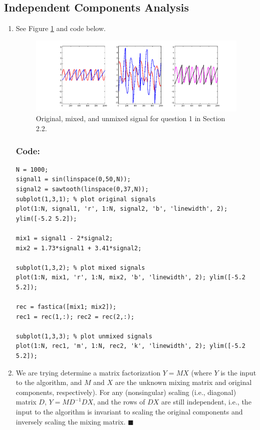 \documentclass[11pt]{article}
\renewcommand{\qed}{\quad \ensuremath{\blacksquare}}
\newcommand{\inv}{^{-1}}
\begin{document}
\newpage
\subsection{Independent Components Analysis}
\begin{enumerate}
\item See Figure \ref{fig:q23} and code below.
\begin{figure}[h!]
\centering
\quad\;
\includegraphics[trim=10mm 0mm 10mm 0mm, clip=true, width=\linewidth]{q23}
\vspace{-6mm}
\caption{Original, mixed, and unmixed signal for question 1 in Section 2.2.}
\label{fig:q23}
\end{figure}
\subsubsection*{Code:}
\begin{verbatim}
N = 1000;
signal1 = sin(linspace(0,50,N));
signal2 = sawtooth(linspace(0,37,N));
subplot(1,3,1); % plot original signals
plot(1:N, signal1, 'r', 1:N, signal2, 'b', 'linewidth', 2); ylim([-5.2 5.2]);

mix1 = signal1 - 2*signal2;
mix2 = 1.73*signal1 + 3.41*signal2;

subplot(1,3,2); % plot mixed signals
plot(1:N, mix1, 'r', 1:N, mix2, 'b', 'linewidth', 2); ylim([-5.2 5.2]);

rec = fastica([mix1; mix2]);
rec1 = rec(1,:); rec2 = rec(2,:);

subplot(1,3,3); % plot unmixed signals
plot(1:N, rec1, 'm', 1:N, rec2, 'k', 'linewidth', 2); ylim([-5.2 5.2]);
\end{verbatim}
\item We are trying determine a matrix factorization $Y = MX$ (where
$Y$ is the input to the algorithm, and $M$ and $X$ are the unknown mixing
matrix and original components, respectively). For any (nonsingular) scaling
(i.e., diagonal) matrix $D$, $Y = MD\inv DX$, and the rows of $DX$ are still
independent, i.e., the input to the algorithm is invariant to scaling the
original components and inversely scaling the mixing matrix. \qed
\end{enumerate}
\end{document}
